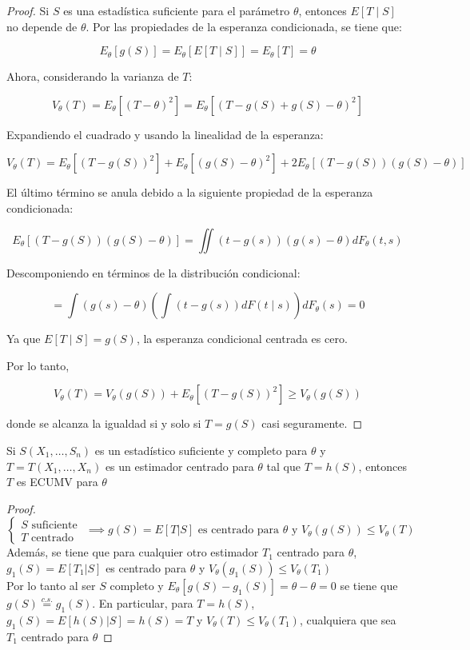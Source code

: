 \begin{proof}
  Si $S$ es una estadística suficiente para el parámetro $\theta$, entonces $E[T \mid S]$ no depende de $\theta$. Por las propiedades de la esperanza condicionada, se tiene que:

  \[
    E_{\theta}[g(S)] = E_{\theta}[E[T \mid S]] = E_{\theta}[T] = \theta
  \]

  Ahora, considerando la varianza de $T$:

  \[
    V_{\theta}(T) = E_{\theta}[(T - \theta)^2] = E_{\theta}[(T - g(S) + g(S) - \theta)^2]
  \]

  Expandiendo el cuadrado y usando la linealidad de la esperanza:

  \[
    V_{\theta}(T) = E_{\theta}[(T - g(S))^2] + E_{\theta}[(g(S) - \theta)^2] + 2E_{\theta}[(T - g(S))(g(S) - \theta)]
  \]

  El último término se anula debido a la siguiente propiedad de la esperanza
  condicionada:

  \[
    E_{\theta}[(T - g(S))(g(S) - \theta)] = \iint (t - g(s))(g(s) - \theta) dF_{\theta}(t, s)
  \]

  Descomponiendo en términos de la distribución condicional:

  \[
    = \int (g(s) - \theta) \left( \int (t - g(s)) dF(t \mid s) \right) dF_{\theta}(s) = 0
  \]

  Ya que $E[T \mid S] = g(S)$, la esperanza condicional centrada es cero.

  Por lo tanto,

  \[
    V_{\theta}(T) = V_{\theta}(g(S)) + E_{\theta}[(T - g(S))^2] \geq V_{\theta}(g(S))
  \]

  donde se alcanza la igualdad si y solo si $T = g(S)$ casi seguramente.
\end{proof}

\begin{teorema}
  Si $S(X_1, \ldots, S_n)$ es un estadístico suficiente y completo para $\theta$ y $T = T(X_1, \ldots, X_n)$ es un estimador centrado para $\theta$ tal que $T = h(S)$, entonces $T$ es ECUMV para $\theta$
\end{teorema}

\begin{proof}
  $\begin{cases} S \text{ suficiente } \\ T \text{ centrado } \end{cases} \implies g(S) = E[T|S] \text{ es centrado para } \theta \text{ y } V_{\theta}(g(S)) \leq V_{\theta}(T)$ \\
  Además, se tiene que para cualquier otro estimador $T_1$ centrado para $\theta$, $g_1(S) = E[T_1 | S]$ es centrado para $\theta$ y $V_{\theta}(g_1(S)) \leq V_{\theta}(T_1)$ \\
  Por lo tanto al ser $S$ completo y $E_{\theta}[g(S) - g_1(S)] = \theta - \theta = 0$ se tiene que $g(S) \stackrel{c.s.}{=} g_1(S)$. En particular, para $T = h(S)$, $g_1(S) = E[h(S) | S] = h(S) = T$ y $V_{\theta}(T) \leq V_{\theta}(T_1)$, cualquiera que sea $T_1$ centrado para $\theta$
\end{proof}

